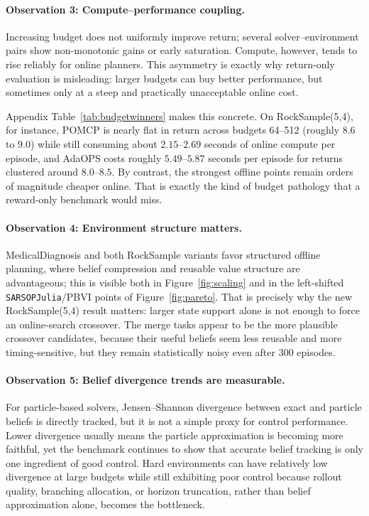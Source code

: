\documentclass[10pt,twocolumn]{article}
\begin{document}
\paragraph{Observation 3: Compute--performance coupling.}
Increasing budget does not uniformly improve return; several solver--environment pairs show non-monotonic gains or early saturation. Compute, however, tends to rise reliably for online planners. This asymmetry is exactly why return-only evaluation is misleading: larger budgets can buy better performance, but sometimes only at a steep and practically unacceptable online cost.

Appendix Table~\ref{tab:budgetwinners} makes this concrete. On RockSample(5,4), for instance, POMCP is nearly flat in return across budgets 64--512 (roughly $8.6$ to $9.0$) while still consuming about $2.15$--$2.69$ seconds of online compute per episode, and AdaOPS costs roughly $5.49$--$5.87$ seconds per episode for returns clustered around $8.0$--$8.5$. By contrast, the strongest offline points remain orders of magnitude cheaper online. That is exactly the kind of budget pathology that a reward-only benchmark would miss.

\paragraph{Observation 4: Environment structure matters.}
MedicalDiagnosis and both RockSample variants favor structured offline planning, where belief compression and reusable value structure are advantageous; this is visible both in Figure~\ref{fig:scaling} and in the left-shifted \texttt{SARSOPJulia}/PBVI points of Figure~\ref{fig:pareto}. That is precisely why the new RockSample(5,4) result matters: larger state support alone is not enough to force an online-search crossover. The merge tasks appear to be the more plausible crossover candidates, because their useful beliefs seem less reusable and more timing-sensitive, but they remain statistically noisy even after 300 episodes.

\paragraph{Observation 5: Belief divergence trends are measurable.}
For particle-based solvers, Jensen--Shannon divergence between exact and particle beliefs is directly tracked, but it is not a simple proxy for control performance. Lower divergence usually means the particle approximation is becoming more faithful, yet the benchmark continues to show that accurate belief tracking is only one ingredient of good control. Hard environments can have relatively low divergence at large budgets while still exhibiting poor control because rollout quality, branching allocation, or horizon truncation, rather than belief approximation alone, becomes the bottleneck.
\end{document}
